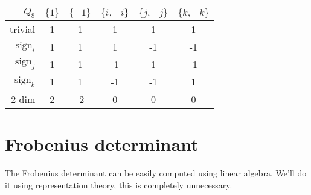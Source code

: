 \begin{center}
	\begin{table}[H]
		\begin{center}
			\begin{tabular}{r|ccccc}
				$Q_8$             & $\{ 1 \}$ & $\{ -1 \}$ & $\{ i, -i \}$ & $\{ j, -j \}$ & $\{ k, -k \}$ \\	\hline
				trivial           & 1         & 1          & 1             & 1             & 1             \\
				$\mathrm{sign}_i$ & 1         & 1          & 1             & -1            & -1            \\
				$\mathrm{sign}_j$ & 1         & 1          & -1            & 1             & -1            \\
				$\mathrm{sign}_k$ & 1         & 1          & -1            & -1            & 1             \\
				2-dim             & 2         & -2         & 0             & 0             & 0
			\end{tabular}
		\end{center}
	\end{table}
\end{center}


\section{Frobenius determinant}
The Frobenius determinant can be easily computed using linear algebra. We'll do it using representation theory, this is completely unnecessary.


